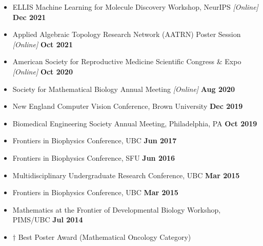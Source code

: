 \documentclass[margin,line]{res}
\begin{document}
\begin{resume}
{\begin{itemize}
\item[] ELLIS Machine Learning for Molecule Discovery Workshop, NeurIPS \textit{[Online]} \hfill {\bf \small  Dec 2021}
\item[] Applied Algebraic Topology Research Network (AATRN) Poster Session \textit{[Online]} \hfill {\bf \small  Oct 2021}
\item[] American Society for Reproductive Medicine Scientific Congress \& Expo \textit{[Online]} \hfill {\bf \small  Oct 2020}
\item[] Society for Mathematical Biology Annual Meeting\textsuperscript{\textdagger} \textit{[Online]} \hfill {\bf \small  Aug 2020}
\item[] New England Computer Vision Conference, Brown University \hfill {\bf \small  Dec 2019}
\item[] Biomedical Engineering Society Annual Meeting, Philadelphia, PA \hfill {\bf \small  Oct 2019}
\item[] Frontiers in Biophysics Conference, UBC \hfill {\bf \small  Jun 2017}
\item[] Frontiers in Biophysics Conference, SFU \hfill {\bf \small Jun 2016}
\item[] Multidisciplinary Undergraduate Research Conference, UBC \hfill {\bf \small Mar 2015}
\item[] Frontiers in Biophysics Conference, UBC \hfill {\bf \small Mar 2015}
\item[] Mathematics at the Frontier of Developmental Biology Workshop, PIMS/UBC \hfill {\bf \small Jul 2014}
\item[] {\small $\dagger$ Best Poster Award (Mathematical Oncology Category)}

\end{itemize}}
\end{resume}
\end{document}
